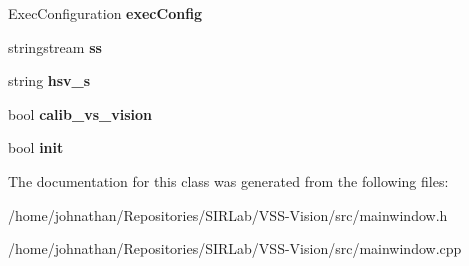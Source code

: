 \begin{DoxyCompactItemize}
\item 
Exec\+Configuration {\bfseries exec\+Config}\hypertarget{classMainWindow_aa43de17b014bc536003744e375edbdfa}{}\label{classMainWindow_aa43de17b014bc536003744e375edbdfa}

\item 
stringstream {\bfseries ss}\hypertarget{classMainWindow_a54b6cd90f16d24527b304706581914b2}{}\label{classMainWindow_a54b6cd90f16d24527b304706581914b2}

\item 
string {\bfseries hsv\+\_\+s}\hypertarget{classMainWindow_a37fe4fad93ad48280423790a7a6ec91b}{}\label{classMainWindow_a37fe4fad93ad48280423790a7a6ec91b}

\item 
bool {\bfseries calib\+\_\+vs\+\_\+vision}\hypertarget{classMainWindow_abe010ee26a578d28fdd957bb622ba6e1}{}\label{classMainWindow_abe010ee26a578d28fdd957bb622ba6e1}

\item 
bool {\bfseries init}\hypertarget{classMainWindow_a851cc4123139bb6d049f4e1e05e3bcc9}{}\label{classMainWindow_a851cc4123139bb6d049f4e1e05e3bcc9}

\end{DoxyCompactItemize}


The documentation for this class was generated from the following files\+:\begin{DoxyCompactItemize}
\item 
/home/johnathan/\+Repositories/\+S\+I\+R\+Lab/\+V\+S\+S-\/\+Vision/src/mainwindow.\+h\item 
/home/johnathan/\+Repositories/\+S\+I\+R\+Lab/\+V\+S\+S-\/\+Vision/src/mainwindow.\+cpp\end{DoxyCompactItemize}
